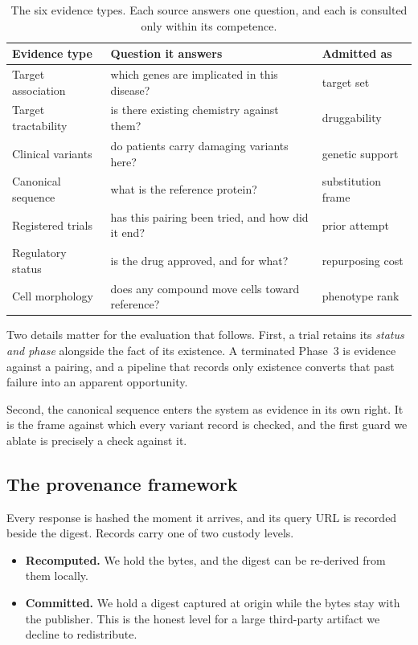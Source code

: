 \begin{table}[h]
\centering
\small
\caption{The six evidence types. Each source answers one question, and each is
consulted only within its competence.}
\label{tab:evidence}
\begin{tabular}{lll}
\toprule
Evidence type & Question it answers & Admitted as \\
\midrule
Target association  & which genes are implicated in this disease?       & target set \\
Target tractability & is there existing chemistry against them?         & druggability \\
Clinical variants   & do patients carry damaging variants here?         & genetic support \\
Canonical sequence  & what is the reference protein?                    & substitution frame \\
Registered trials   & has this pairing been tried, and how did it end?  & prior attempt \\
Regulatory status   & is the drug approved, and for what?               & repurposing cost \\
Cell morphology     & does any compound move cells toward reference?    & phenotype rank \\
\bottomrule
\end{tabular}
\end{table}

Two details matter for the evaluation that follows. First, a trial retains its
\emph{status and phase} alongside the fact of its existence. A terminated
Phase~3 is evidence against a pairing, and a pipeline that records only
existence converts that past failure into an apparent opportunity.

Second, the canonical sequence enters the system as evidence in its own right.
It is the frame against which every variant record is checked, and the first
guard we ablate is precisely a check against it.

\subsection{The provenance framework}

Every response is hashed the moment it arrives, and its query URL is recorded
beside the digest. Records carry one of two custody levels.

\begin{itemize}
\item \textbf{Recomputed.} We hold the bytes, and the digest can be re-derived
from them locally.
\item \textbf{Committed.} We hold a digest captured at origin while the bytes
stay with the publisher. This is the honest level for a large third-party
artifact we decline to redistribute.
\end{itemize}

